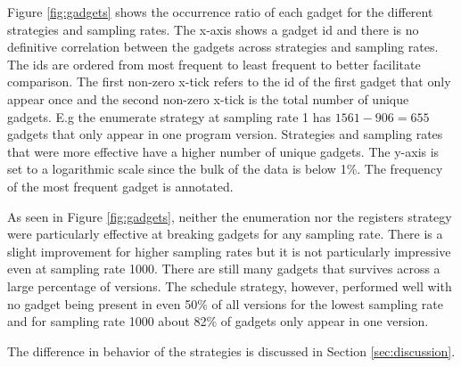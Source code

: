 Figure \ref{fig:gadgets} shows the occurrence ratio of each gadget for the different
strategies and sampling rates. The x-axis shows a gadget id and there is no definitive
correlation between the gadgets across strategies and sampling rates. The ids are ordered
from most frequent to least frequent to better facilitate comparison. The first non-zero
x-tick refers to the id of the first gadget that only appear once and the second non-zero
x-tick is the total number of unique gadgets. E.g the enumerate strategy at sampling rate
1 has $1561-906=655$ gadgets that only appear in one program version. Strategies and
sampling rates that were more effective have a higher number of unique gadgets. The y-axis
is set to a logarithmic scale since the bulk of the data is below 1\%. The frequency of
the most frequent gadget is annotated.

As seen in Figure \ref{fig:gadgets}, neither the enumeration nor the registers strategy
were particularly effective at breaking gadgets for any sampling rate. There is a slight
improvement for higher sampling rates but it is not particularly impressive even at
sampling rate 1000. There are still many gadgets that survives across a large percentage of
versions. The schedule strategy, however, performed well with no gadget being present
in even 50\% of all versions for the lowest sampling rate and for sampling rate 1000
about 82\% of gadgets only appear in one version.

The difference in behavior of the strategies is discussed in Section \ref{sec:discussion}.

